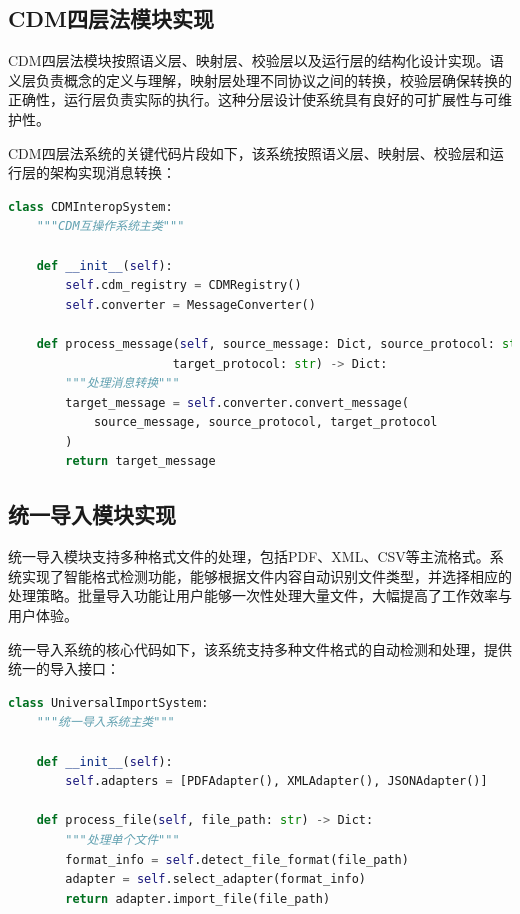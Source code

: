 \subsection{CDM四层法模块实现}

CDM四层法模块按照语义层、映射层、校验层以及运行层的结构化设计实现。语义层负责概念的定义与理解，映射层处理不同协议之间的转换，校验层确保转换的正确性，运行层负责实际的执行。这种分层设计使系统具有良好的可扩展性与可维护性。

CDM四层法系统的关键代码片段如下，该系统按照语义层、映射层、校验层和运行层的架构实现消息转换：

\begin{lstlisting}[language=Python, label=fig:cdm_system]
class CDMInteropSystem:
    """CDM互操作系统主类"""
    
    def __init__(self):
        self.cdm_registry = CDMRegistry()
        self.converter = MessageConverter()
    
    def process_message(self, source_message: Dict, source_protocol: str, 
                       target_protocol: str) -> Dict:
        """处理消息转换"""
        target_message = self.converter.convert_message(
            source_message, source_protocol, target_protocol
        )
        return target_message
\end{lstlisting}

\subsection{统一导入模块实现}

统一导入模块支持多种格式文件的处理，包括PDF、XML、CSV等主流格式。系统实现了智能格式检测功能，能够根据文件内容自动识别文件类型，并选择相应的处理策略。批量导入功能让用户能够一次性处理大量文件，大幅提高了工作效率与用户体验。

统一导入系统的核心代码如下，该系统支持多种文件格式的自动检测和处理，提供统一的导入接口：

\begin{lstlisting}[language=Python, label=fig:universal_import]
class UniversalImportSystem:
    """统一导入系统主类"""
    
    def __init__(self):
        self.adapters = [PDFAdapter(), XMLAdapter(), JSONAdapter()]
    
    def process_file(self, file_path: str) -> Dict:
        """处理单个文件"""
        format_info = self.detect_file_format(file_path)
        adapter = self.select_adapter(format_info)
        return adapter.import_file(file_path)
\end{lstlisting}

